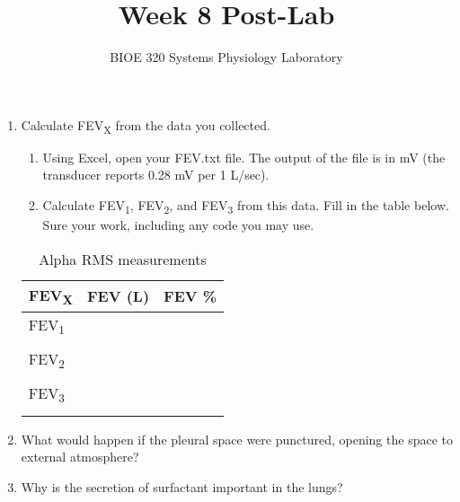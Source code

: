 \documentclass{article}
\title{Week 8 Post-Lab}
\author{BIOE 320 Systems Physiology Laboratory}
\date{}
\begin{document}
\maketitle
\large

\begin{enumerate}
	\item Calculate FEV\textsubscript{X} from the data you collected.\begin{enumerate}
	\item Using Excel, open your FEV.txt file. The output of the file is in mV (the transducer reports 0.28 mV per 1 L/sec).
	\item Calculate FEV\textsubscript{1}, FEV\textsubscript{2}, and FEV\textsubscript{3} from this data. Fill in the table below. Sure your work, including any code you may use.
		\end{enumerate}
	
		\begin{table}[h]
	\centering
	\caption{Alpha RMS measurements}
	\begin{tabular}[h!]{p{}|p{}p{}}
	\toprule
	FEV\textsubscript{X} & FEV (L) & FEV \%\\
	\midrule
	FEV\textsubscript{1} & &\\ & &\\ \midrule
	FEV\textsubscript{2} & &\\ & &\\ \midrule
	FEV\textsubscript{3} & &\\ & &\\ \bottomrule
	\end{tabular}
	\end{table}
	
	\item What would happen if the pleural space were punctured, opening the space to external atmosphere?
	\item Why is the secretion of surfactant important in the lungs?
\end{enumerate}
\end{document}
